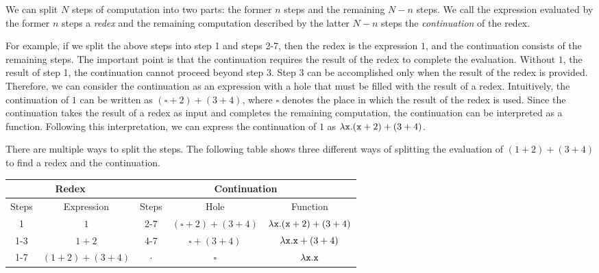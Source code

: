 We can split $N$ steps of computation into two parts: the former $n$ steps and the
remaining $N-n$ steps. We call the expression evaluated by the former $n$ steps
a \textit{redex} and the remaining computation described by the
latter $N-n$ steps the \textit{continuation} of the redex.

For example, if we split the above steps into step 1 and steps 2-7, then the redex is
the expression $1$, and the continuation consists of the remaining steps.
The important point is that the continuation requires the result of the redex to
complete the evaluation. Without $1$, the result of step 1, the continuation
cannot proceed beyond step 3. Step 3 can be accomplished only when the result of
the redex is provided. Therefore, we can consider the continuation as an
expression with a hole that must be filled with the result of a redex.
Intuitively, the continuation of $1$ can be written as $(\square+2)+(3+4)$, where
$\square$ denotes the place in which the result of the redex is used.
Since the continuation takes the result of a redex as input and completes the
remaining computation, the continuation can be interpreted as a function.
Following this interpretation, we can express the continuation of $1$ as
$\lambda\texttt{x}.(\texttt{x}+2)+(3+4)$.

There are multiple ways to split the steps. The following table shows
three different ways of splitting the evaluation of $(1+2)+(3+4)$ to find a redex and the
continuation.

\begin{tabular}{|c|@{~}c|c|@{~}c@{~}|@{~}c@{~}|}
  \hline
  \multicolumn{2}{|c|}{Redex}&\multicolumn{3}{c|}{Continuation} \\
  \hline
  Steps & Expression & Steps & Hole & Function \\
  \hline
  \hline
  1 & $1$ & 2-7 & $(\square+2)+(3+4)$ & $\lambda\texttt{x}.(\texttt{x}+2)+(3+4)$ \\
  \hline
  1-3 & $1+2$ & 4-7 & $\square+(3+4)$ & $\lambda\texttt{x}.\texttt{x}+(3+4)$ \\
  \hline
  1-7 & $(1+2)+(3+4)$ & $\cdot$ & $\square$ & $\lambda\texttt{x}.\texttt{x}$ \\
  \hline
\end{tabular}

